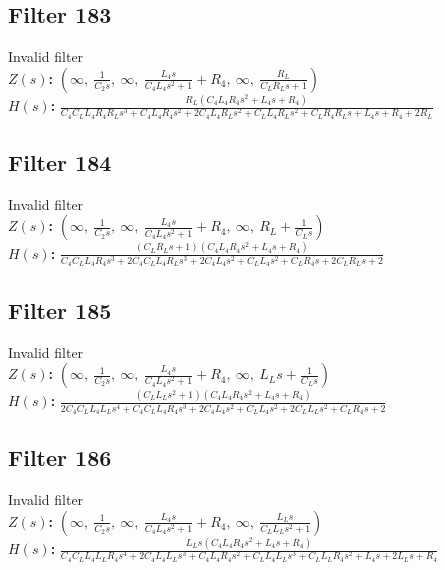 \documentclass{article}
\begin{document}
\subsection*{Filter 183}
Invalid filter \\ 
\textbf{$Z(s)$:} $\left( \infty, \  \frac{1}{C_{2} s}, \  \infty, \  \frac{L_{4} s}{C_{4} L_{4} s^{2} + 1} + R_{4}, \  \infty, \  \frac{R_{L}}{C_{L} R_{L} s + 1}\right)$ \\ 
\textbf{$H(s)$:} $\frac{R_{L} \left(C_{4} L_{4} R_{4} s^{2} + L_{4} s + R_{4}\right)}{C_{4} C_{L} L_{4} R_{4} R_{L} s^{3} + C_{4} L_{4} R_{4} s^{2} + 2 C_{4} L_{4} R_{L} s^{2} + C_{L} L_{4} R_{L} s^{2} + C_{L} R_{4} R_{L} s + L_{4} s + R_{4} + 2 R_{L}}$ \\ 
\subsection*{Filter 184}
Invalid filter \\ 
\textbf{$Z(s)$:} $\left( \infty, \  \frac{1}{C_{2} s}, \  \infty, \  \frac{L_{4} s}{C_{4} L_{4} s^{2} + 1} + R_{4}, \  \infty, \  R_{L} + \frac{1}{C_{L} s}\right)$ \\ 
\textbf{$H(s)$:} $\frac{\left(C_{L} R_{L} s + 1\right) \left(C_{4} L_{4} R_{4} s^{2} + L_{4} s + R_{4}\right)}{C_{4} C_{L} L_{4} R_{4} s^{3} + 2 C_{4} C_{L} L_{4} R_{L} s^{3} + 2 C_{4} L_{4} s^{2} + C_{L} L_{4} s^{2} + C_{L} R_{4} s + 2 C_{L} R_{L} s + 2}$ \\ 
\subsection*{Filter 185}
Invalid filter \\ 
\textbf{$Z(s)$:} $\left( \infty, \  \frac{1}{C_{2} s}, \  \infty, \  \frac{L_{4} s}{C_{4} L_{4} s^{2} + 1} + R_{4}, \  \infty, \  L_{L} s + \frac{1}{C_{L} s}\right)$ \\ 
\textbf{$H(s)$:} $\frac{\left(C_{L} L_{L} s^{2} + 1\right) \left(C_{4} L_{4} R_{4} s^{2} + L_{4} s + R_{4}\right)}{2 C_{4} C_{L} L_{4} L_{L} s^{4} + C_{4} C_{L} L_{4} R_{4} s^{3} + 2 C_{4} L_{4} s^{2} + C_{L} L_{4} s^{2} + 2 C_{L} L_{L} s^{2} + C_{L} R_{4} s + 2}$ \\ 
\subsection*{Filter 186}
Invalid filter \\ 
\textbf{$Z(s)$:} $\left( \infty, \  \frac{1}{C_{2} s}, \  \infty, \  \frac{L_{4} s}{C_{4} L_{4} s^{2} + 1} + R_{4}, \  \infty, \  \frac{L_{L} s}{C_{L} L_{L} s^{2} + 1}\right)$ \\ 
\textbf{$H(s)$:} $\frac{L_{L} s \left(C_{4} L_{4} R_{4} s^{2} + L_{4} s + R_{4}\right)}{C_{4} C_{L} L_{4} L_{L} R_{4} s^{4} + 2 C_{4} L_{4} L_{L} s^{3} + C_{4} L_{4} R_{4} s^{2} + C_{L} L_{4} L_{L} s^{3} + C_{L} L_{L} R_{4} s^{2} + L_{4} s + 2 L_{L} s + R_{4}}$ \\ 
\end{document}

